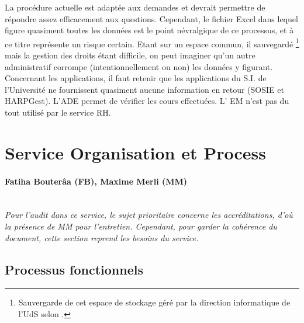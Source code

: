 \documentclass{book}
\begin{document}
La procédure actuelle est adaptée aux demandes et devrait permettre de 
répondre assez efficacement aux questions. Cependant, le fichier Excel
dans lequel figure quasiment toutes les données est le point névralgique
de ce processus, et à ce titre représente un risque certain. Etant sur
un espace commun, il sauvegardé%
\footnote{Sauvergarde de cet espace de stockage géré par la direction 
informatique de l'UdS selon \CK.
}
mais la gestion des droits étant difficile, on peut imaginer qu'un autre 
administratif corrompe (intentionnellement ou non) les données y figurant.\\

Concernant les applications, il faut retenir que les applications
du S.I. de l'Université ne fournissent quasiment aucune information en
retour (SOSIE et HARPGest). L'ADE permet de vérifier les cours effectuées.
L' EM n'est pas du tout utilisé par le service RH.
 



\section{Service Organisation et Process}

\paragraph{Fatiha Bouterâa (FB), Maxime Merli (MM)} 
~\\

\textit{Pour l'audit dans ce service, le sujet prioritaire concerne les 
accréditations, d'où la présence de MM pour l'entretien. Cependant, pour 
garder la cohérence du document, cette section reprend les besoins du service.}

\subsection{Processus fonctionnels}
\label{sc:sop-process}
\end{document}

